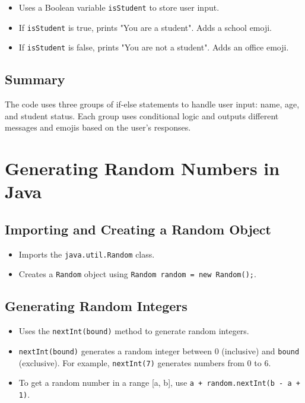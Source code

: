 \documentclass{article}
\begin{document}
\begin{itemize}
    \item Uses a Boolean variable \texttt{isStudent} to store user input.
    \item  If \texttt{isStudent} is true, prints "You are a student". Adds a school emoji.
    \item If \texttt{isStudent} is false, prints "You are not a student". Adds an office emoji.
\end{itemize}

\subsection{Summary}
The code uses three groups of if-else statements to handle user input: name, age, and student status.  Each group uses conditional logic and outputs different messages and emojis based on the user's responses.


\section{Generating Random Numbers in Java}

\subsection{Importing and Creating a Random Object}

\begin{itemize}
    \item Imports the \texttt{java.util.Random} class.
    \item Creates a \texttt{Random} object using \texttt{Random random = new Random();}.
\end{itemize}

\subsection{Generating Random Integers}

\begin{itemize}
    \item Uses the \texttt{nextInt(bound)} method to generate random integers.
    \item \texttt{nextInt(bound)} generates a random integer between 0 (inclusive) and \texttt{bound} (exclusive).  For example, \texttt{nextInt(7)} generates numbers from 0 to 6.
    \item To get a random number in a range [a, b], use \texttt{a + random.nextInt(b - a + 1)}.
\end{itemize}
\end{document}
